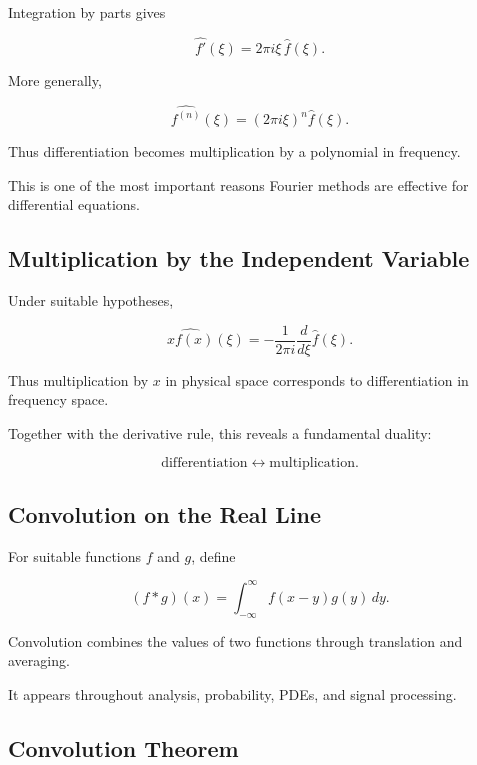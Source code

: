 Integration by parts gives

\[
\boxed{
\widehat{f'}(\xi)
=
2\pi i\xi\,\widehat{f}(\xi).
}
\]

More generally,

\[
\boxed{
\widehat{f^{(n)}}(\xi)
=
(2\pi i\xi)^n
\widehat{f}(\xi).
}
\]

Thus differentiation becomes multiplication by a polynomial in frequency.

This is one of the most important reasons Fourier methods are effective
for differential equations.

\subsection{Multiplication by the Independent Variable}
\label{subsec:fourier-multiplication-x}

Under suitable hypotheses,

\[
\boxed{
\widehat{xf(x)}(\xi)
=
-\frac{1}{2\pi i}
\frac{d}{d\xi}
\widehat{f}(\xi).
}
\]

Thus multiplication by \(x\) in physical space corresponds to
differentiation in frequency space.

Together with the derivative rule, this reveals a fundamental duality:

\[
\boxed{
\text{differentiation}
\longleftrightarrow
\text{multiplication}.
}
\]

\subsection{Convolution on the Real Line}
\label{subsec:convolution-real-line}

For suitable functions \(f\) and \(g\), define

\[
\boxed{
(f*g)(x)
=
\int_{-\infty}^{\infty}
f(x-y)g(y)\,dy.
}
\]

Convolution combines the values of two functions through translation and
averaging.

It appears throughout analysis, probability, PDEs, and signal processing.

\subsection{Convolution Theorem}
\label{subsec:convolution-theorem-fourier}

